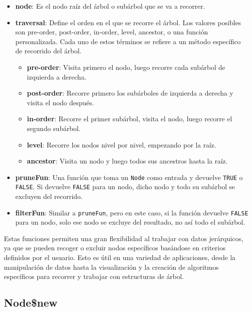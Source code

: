 \documentclass[12pt]{report}\usepackage[]{graphicx}\usepackage[dvipsnames]{xcolor}
\begin{document}
 	\begin{itemize}
 		\item \textbf{node}: Es el nodo raíz del árbol o subárbol que se va a recorrer.
 		\item \textbf{traversal}: Define el orden en el que se recorre el árbol. Los valores posibles son pre-order, post-order, in-order, level, ancestor, o una función personalizada. Cada uno de estos términos se refiere a un método específico de recorrido del árbol.
 		
 		\begin{itemize}
 			\item \textbf{pre-order}: Visita primero el nodo, luego recorre cada subárbol de izquierda a derecha.
 			\item \textbf{post-order}: Recorre primero los subárboles de izquierda a derecha y visita el nodo después.
 			\item \textbf{in-order}: Recorre el primer subárbol, visita el nodo, luego recorre el segundo subárbol.
 			\item \textbf{level}: Recorre los nodos nivel por nivel, empezando por la raíz.
 			\item \textbf{ancestor}: Visita un nodo y luego todos sus ancestros hasta la raíz.
 		\end{itemize}
 		
 		\item \textbf{pruneFun}: Una función que toma un \texttt{Node} como entrada y devuelve \texttt{TRUE} o \texttt{FALSE}. Si devuelve \texttt{FALSE} para un nodo, dicho nodo y todo su subárbol se excluyen del recorrido.
 		\item \textbf{filterFun}: Similar a \texttt{pruneFun}, pero en este caso, si la función devuelve \texttt{FALSE} para un nodo, solo ese nodo se excluye del resultado, no así todo el subárbol.
 	\end{itemize}
 	
 	Estas funciones permiten una gran flexibilidad al trabajar con datos jerárquicos, ya que se pueden recoger o excluir nodos específicos basándose en criterios definidos por el usuario. Esto es útil en una variedad de aplicaciones, desde la manipulación de datos hasta la visualización y la creación de algoritmos específicos para recorrer y trabajar con estructuras de árbol.
 	
 	\subsection{Node\$new}
 	
\end{document}
